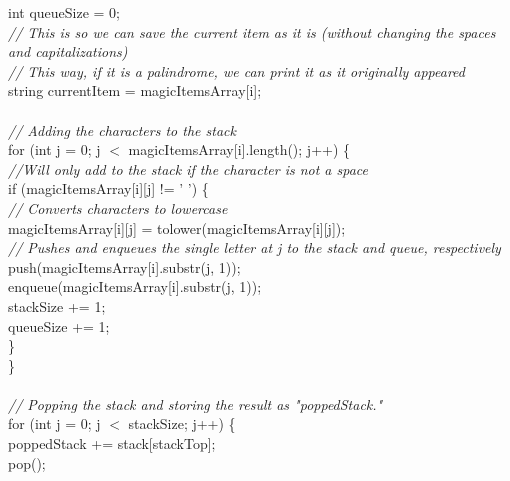 \documentclass{article}
\begin{document}
\begin {linenumbers}
{        \indent \indent int queueSize = 0;\\
        \textit{\indent \indent // This is so we can save the current item as it is (without changing the spaces and capitalizations)\\
        \indent \indent // This way, if it is a palindrome, we can print it as it originally appeared\\}
        \indent \indent string currentItem = magicItemsArray[i];\\
\\
        \textit{\indent \indent // Adding the characters to the stack\\}
        \indent \indent for (int j = 0; j $<$ magicItemsArray[i].length(); j++) \{\\
            \textit{\indent \indent \indent //Will only add to the stack if the character is not a space\\}
            \indent \indent \indent if (magicItemsArray[i][j] != ' ') \{\\
                \textit{\indent \indent \indent \indent // Converts characters to lowercase\\}
                \indent \indent \indent \indent magicItemsArray[i][j] = tolower(magicItemsArray[i][j]);\\
                \textit{\indent \indent \indent \indent // Pushes and enqueues the single letter at j to the stack and queue, respectively\\}
                \indent \indent \indent \indent push(magicItemsArray[i].substr(j, 1));\\
                \indent \indent \indent \indent enqueue(magicItemsArray[i].substr(j, 1));\\
                \indent \indent \indent \indent stackSize += 1;\\
                \indent \indent \indent \indent queueSize += 1;\\
            \indent \indent \indent \}\\
        \indent \indent \}\\
\\
        \textit{\indent \indent // Popping the stack and storing the result as "poppedStack."\\}
        \indent \indent for (int j = 0; j $<$ stackSize; j++) \{\\
            \indent \indent \indent poppedStack += stack[stackTop];\\
            \indent \indent \indent pop();\\
}
\end{linenumbers}
\end{document}
